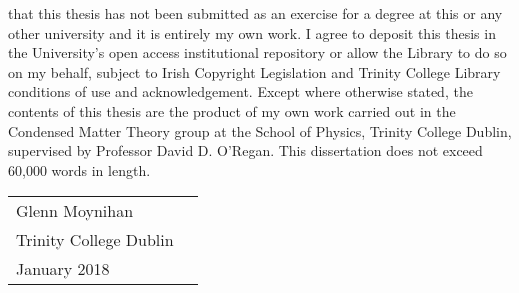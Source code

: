  that this thesis has not been submitted 
as an exercise for a degree at this or any other university 
and it is entirely my own work.
%
I agree to deposit this thesis in the University's open access 
institutional repository or allow the Library to do so on my behalf, 
subject to Irish Copyright Legislation and
Trinity College Library conditions of use and acknowledgement.
%
Except where otherwise stated, 
the contents of this thesis are the product of my own work 
carried out in the Condensed Matter Theory group 
at the School of Physics, Trinity College Dublin, 
supervised by Professor David D. O'Regan.
\bigbreak
\noindent This dissertation does not exceed 60,000 words in length.
\bigbreak
\bigbreak
\bigbreak
\bigbreak
\bigbreak

\noindent\begin{tabular}{ll}
Glenn Moynihan \qquad\qquad\qquad &\\
Trinity College Dublin  &\\
January 2018 &
\end{tabular}

